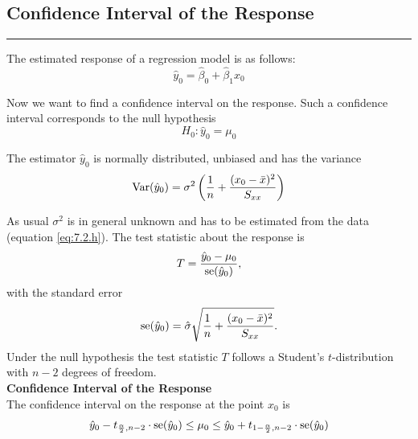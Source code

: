 \subsection{Confidence Interval of the Response}
\noindent\rule[\linienAbstand]{\linewidth}{\linienDicke}
The estimated response of a regression model is as follows:
\begin{equation}
  \hat{y}_0 = \hat{\beta}_0 +  \hat{\beta}_1 x_0
\end{equation}

Now we want to find a confidence interval on the response. Such a confidence interval corresponds to the null hypothesis
\begin{equation}
  H_0: \hat{y}_0 = \mu_0
\end{equation}

The estimator $\hat{y}_0$ is normally distributed, unbiased and has the variance
\begin{equation}
  \textup{Var}(\hat{y}_0) = \sigma^2\left(\frac{1}{n} + \frac{(x_0 - \bar{x})^2}{S_{xx}}\right)
\end{equation}

As usual $\sigma^2$ is in general unknown and has to be estimated from the data (equation \ref{eq:7.2.h}). The test statistic about the response is
\begin{equation}
  T = \frac{\hat{y}_0 - \mu_0}{\textup{se}(\hat{y}_0)},
\end{equation}
with the standard error
\begin{equation}
  \textup{se}(\hat{y}_0)=\hat{\sigma}\sqrt{\frac{1}{n} + \frac{(x_0 - \bar{x})^2}{S_{xx}}}.
\end{equation}
Under the null hypothesis the test statistic $T$ follows a Student’s $t$-distribution with $n - 2$ degrees of freedom.\\

\textbf{Confidence Interval of the Response}\\
The confidence interval on the response at the point $x_0$ is
\begin{equation}
  \hat{y}_0 - t_{\frac{\alpha}{2},n-2} \cdot \textup{se}(\hat{y}_0)
  \leq \mu_0 \leq
  \hat{y}_0 + t_{1 - \frac{\alpha}{2},n-2} \cdot \textup{se}(\hat{y}_0)
\end{equation}

